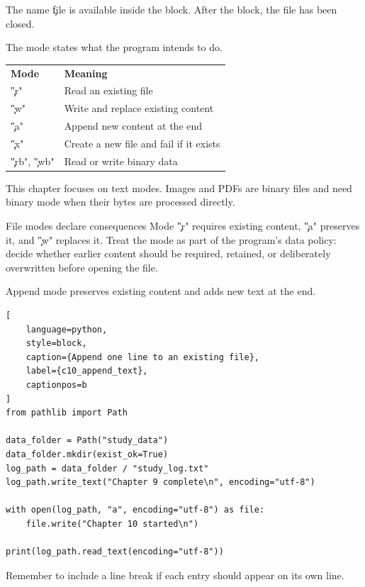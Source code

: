 The name \c{file} is available inside the block. After the block, the file has
been closed.


The mode states what the program intends to do.

\begin{center}
\begin{tabular}{ll}
\textbf{Mode} & \textbf{Meaning} \\
\c{"r"} & Read an existing file \\
\c{"w"} & Write and replace existing content \\
\c{"a"} & Append new content at the end \\
\c{"x"} & Create a new file and fail if it exists \\
\c{"rb"}, \c{"wb"} & Read or write binary data \\
\end{tabular}
\end{center}

This chapter focuses on text modes. Images and PDFs are binary files and need
binary mode when their bytes are processed directly.

\begin{ExplainBox}{File modes declare consequences}
Mode \c{"r"} requires existing content, \c{"a"} preserves it, and \c{"w"}
replaces it. Treat the mode as part of the program's data policy: decide
whether earlier content should be required, retained, or deliberately
overwritten before opening the file.
\end{ExplainBox}


Append mode preserves existing content and adds new text at the end.

\begin{lstlisting}[
    language=python,
    style=block,
    caption={Append one line to an existing file},
    label={c10_append_text},
    captionpos=b
]
from pathlib import Path

data_folder = Path("study_data")
data_folder.mkdir(exist_ok=True)
log_path = data_folder / "study_log.txt"
log_path.write_text("Chapter 9 complete\n", encoding="utf-8")

with open(log_path, "a", encoding="utf-8") as file:
    file.write("Chapter 10 started\n")

print(log_path.read_text(encoding="utf-8"))
\end{lstlisting}

Remember to include a line break if each entry should appear on its own line.

